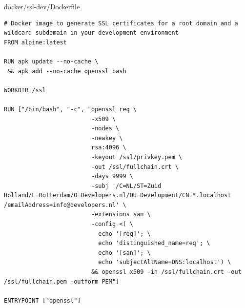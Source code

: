 docker/ssl-dev/Dockerfile
\begin{verbatim}
# Docker image to generate SSL certificates for a root domain and a wildcard subdomain in your development environment
FROM alpine:latest

RUN apk update --no-cache \
 && apk add --no-cache openssl bash

WORKDIR /ssl

RUN ["/bin/bash", "-c", "openssl req \
                         -x509 \
                         -nodes \
                         -newkey \
                         rsa:4096 \
                         -keyout /ssl/privkey.pem \
                         -out /ssl/fullchain.crt \
                         -days 9999 \
                         -subj '/C=NL/ST=Zuid Holland/L=Rotterdam/O=Developers.nl/OU=Development/CN=*.localhost /emailAddress=info@developers.nl' \
                         -extensions san \
                         -config <( \
                           echo '[req]'; \
                           echo 'distinguished_name=req'; \
                           echo '[san]'; \
                           echo 'subjectAltName=DNS:localhost') \
                         && openssl x509 -in /ssl/fullchain.crt -out /ssl/fullchain.pem -outform PEM"]

ENTRYPOINT ["openssl"]
\end{verbatim}

